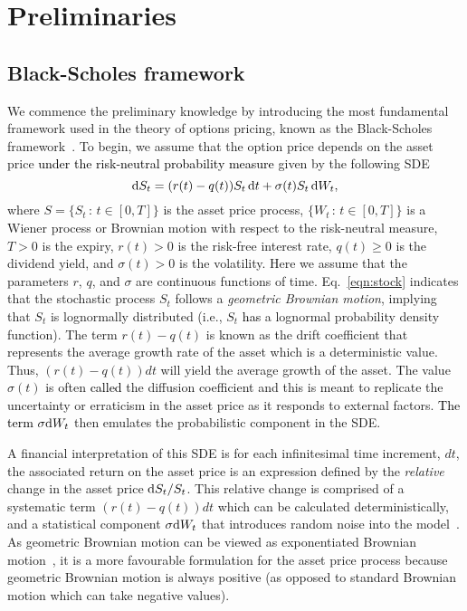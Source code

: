 \chapter{Preliminaries}

\section{Black-Scholes framework}
We commence the preliminary knowledge by introducing the most fundamental framework used in the theory of options pricing, known as the Black-Scholes framework~\cite{Black1973}. To begin, we assume that the option price depends on the asset price \textcolor{black}{under the risk-neutral probability measure} given by the following SDE
	\begin{equation}
	\label{eqn:stock}
		\mathrm d S_t = (r(t)-q(t))S_t \, \mathrm d t + \sigma(t)S_t  \, \mathrm d W_t,
	\end{equation}
where $S = \{ S_t \, : \, t \in [0,T] \}$ is the asset price process, $\{ W_t \, : \, t \in [0,T] \}$ is a Wiener process or Brownian motion with respect to the risk-neutral measure, $T > 0$ is the expiry, $r(t) > 0$ is the risk-free interest rate, $q(t) \geq 0$ is the dividend yield, and $\sigma(t) > 0$ is the volatility.
Here we assume that the parameters $r$, $q$, and $\sigma$ are continuous functions of time. Eq.~\eqref{eqn:stock} indicates that the stochastic process $S_t$ follows a
\emph{geometric Brownian motion}, implying that $S_t$ is lognormally distributed (i.e., $S_t$ \textcolor{black}{has} a lognormal probability density function). The term $r(t)-q(t)$ is known as the drift coefficient that represents the average growth rate of the asset which is a deterministic value. Thus, $(r(t)-q(t))dt$ will yield the average growth of the asset.
The value $\sigma(t)$ is often \textcolor{black}{called} the diffusion coefficient and this is meant to replicate the uncertainty or erraticism in the asset price as it responds to external factors. \textcolor{black}{The term $\sigma \mathrm d W_t$} then emulates the probabilistic component in the SDE.

A financial interpretation of this SDE is for each infinitesimal time increment, $dt$, the associated return on the asset price is an expression defined by the \emph{relative} change in the asset price $\mathrm d S_t/S_t$.
This relative change is comprised of a systematic term $(r(t)-q(t))dt$ which can be calculated deterministically, and a statistical component $\sigma \mathrm d W_t$ that introduces random noise into the model~\cite{Wilmott1995}. As geometric Brownian motion can be viewed as exponentiated Brownian motion~\cite{Glasserman2013}, it is a more favourable formulation for the asset price process
because geometric Brownian motion is always positive (as opposed to standard Brownian motion which can take negative values).


